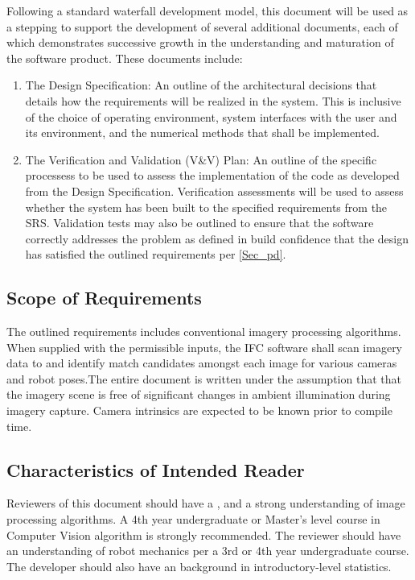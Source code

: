 \documentclass[12pt]{article}
\begin{document}
Following a standard waterfall development model, this document will be used as a 
stepping to support the development of several additional documents, each of which 
demonstrates successive growth in the understanding and maturation of the software 
product. These documents include:
\begin{enumerate}
  \item The Design Specification: An outline of the architectural decisions that 
  details   how the requirements will be realized in the system. This is inclusive 
  of the choice of operating environment, system interfaces with the user and its 
  environment, and the   numerical methods that shall be implemented.

  \item The Verification and Validation (V\&V) Plan: An outline of the specific processess 
  to be used to assess the implementation of the code as developed from the Design 
  Specification. Verification assessments will be used to assess whether the system has been 
  built to the specified requirements from the SRS. Validation tests may also be outlined to 
  ensure that the software correctly addresses the problem as defined in  build confidence 
  that the   design has satisfied the outlined requirements per \ref{Sec_pd}.
\end{enumerate}


\subsection{Scope of Requirements} 
The outlined requirements includes conventional imagery processing algorithms. When supplied 
with the permissible inputs, the IFC software shall scan imagery data to and 
identify match candidates amongst each image for various cameras and robot poses.The entire 
document is written under the assumption that that the imagery scene 
is free of significant changes in ambient illumination during imagery capture. Camera 
intrinsics are expected to be known prior to compile time.

\subsection{Characteristics of Intended Reader} \label{sec_IntendedReader}
Reviewers of this document should have a , 
and a strong understanding of image processing algorithms. A 4th year undergraduate or 
Master's level course in Computer Vision algorithm is strongly recommended. The 
reviewer should have an understanding of robot mechanics per a 3rd or 4th year 
undergraduate course. The developer should also have an background in introductory-level 
statistics.
\end{document}

